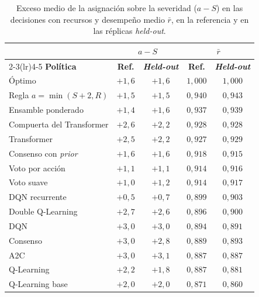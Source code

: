 \documentclass[../00_Main/Main.tex]{subfiles}
\begin{document}
\begin{table}[!t]
\centering
\caption[Exceso medio de asignaci\'on y desempe\~no]{Exceso medio de la
asignaci\'on sobre la severidad ($a - S$) en las decisiones con recursos y
desempe\~no medio $\bar r$, en la referencia y en las r\'eplicas
\emph{held-out}.}
\label{tab:policy-rule}
\small
\begin{tabular}{@{}lcccc@{}}
\toprule
 & \multicolumn{2}{c}{$a - S$} & \multicolumn{2}{c}{$\bar r$} \\
\cmidrule(lr){2-3}\cmidrule(lr){4-5}
\textbf{Pol\'itica} & \textbf{Ref.} & \textbf{\emph{Held-out}} & \textbf{Ref.} & \textbf{\emph{Held-out}} \\
\midrule
\'Optimo                    & $+1{,}6$ & $+1{,}6$ & $1{,}000$ & $1{,}000$ \\
Regla $a = \min(S + 2, R)$  & $+1{,}5$ & $+1{,}5$ & $0{,}940$ & $0{,}943$ \\
\midrule
Ensamble ponderado          & $+1{,}4$ & $+1{,}6$ & $0{,}937$ & $0{,}939$ \\
Compuerta del Transformer   & $+2{,}6$ & $+2{,}2$ & $0{,}928$ & $0{,}928$ \\
Transformer                 & $+2{,}5$ & $+2{,}2$ & $0{,}927$ & $0{,}929$ \\
Consenso con \emph{prior}   & $+1{,}6$ & $+1{,}6$ & $0{,}918$ & $0{,}915$ \\
Voto por acci\'on           & $+1{,}1$ & $+1{,}1$ & $0{,}914$ & $0{,}916$ \\
Voto suave                  & $+1{,}0$ & $+1{,}2$ & $0{,}914$ & $0{,}917$ \\
DQN recurrente              & $+0{,}5$ & $+0{,}7$ & $0{,}899$ & $0{,}903$ \\
Double Q-Learning           & $+2{,}7$ & $+2{,}6$ & $0{,}896$ & $0{,}900$ \\
DQN                         & $+3{,}0$ & $+3{,}0$ & $0{,}894$ & $0{,}891$ \\
Consenso                    & $+3{,}0$ & $+2{,}8$ & $0{,}889$ & $0{,}893$ \\
A2C                         & $+3{,}0$ & $+3{,}1$ & $0{,}887$ & $0{,}887$ \\
Q-Learning                  & $+2{,}2$ & $+1{,}8$ & $0{,}887$ & $0{,}881$ \\
Q-Learning base             & $+2{,}0$ & $+2{,}0$ & $0{,}871$ & $0{,}860$ \\
\bottomrule
\end{tabular}
\end{table}
\end{document}
